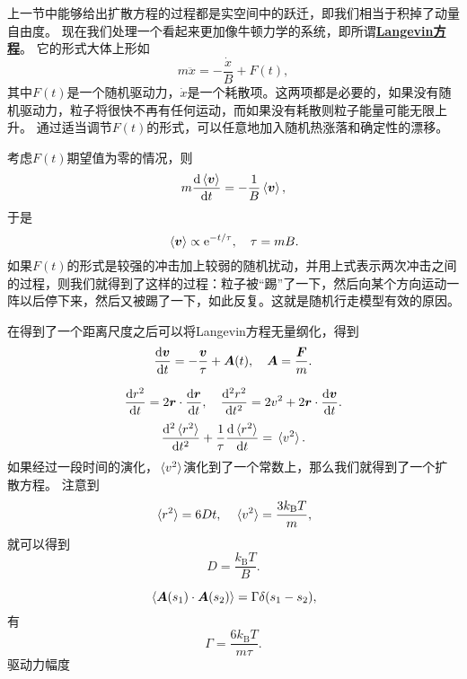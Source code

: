\documentclass[hyperref, UTF8, a4paper]{ctexart}
\newcommand*{\ee}{\mathrm{e}}
\newcommand{\concept}[1]{\underline{\textbf{#1}}}
\begin{document}
上一节中能够给出扩散方程的过程都是实空间中的跃迁，即我们相当于积掉了动量自由度。
现在我们处理一个看起来更加像牛顿力学的系统，即所谓\concept{Langevin方程}。
它的形式大体上形如
\begin{equation}
    m \ddot{x} = - \frac{\dot{x}}{B} + F(t),
\end{equation}
其中$F(t)$是一个随机驱动力，$\dot{x}$是一个耗散项。这两项都是必要的，如果没有随机驱动力，粒子将很快不再有任何运动，而如果没有耗散则粒子能量可能无限上升。
通过适当调节$F(t)$的形式，可以任意地加入随机热涨落和确定性的漂移。

考虑$F(t)$期望值为零的情况，则
\[
    m \dv{\expval*{\vb*{v}}}{t} = - \frac{1}{B} \expval*{\vb*{v}},
\]
于是
\begin{equation}
    \expval*{\vb*{v}} \propto \ee^{-t / \tau}, \quad \tau = mB.
\end{equation}
如果$F(t)$的形式是较强的冲击加上较弱的随机扰动，并用上式表示两次冲击之间的过程，则我们就得到了这样的过程：粒子被“踢”了一下，然后向某个方向运动一阵以后停下来，然后又被踢了一下，如此反复。这就是随机行走模型有效的原因。

在得到了一个距离尺度之后可以将Langevin方程无量纲化，得到
\begin{equation}
    \dv{\vb*{v}}{t} = - \frac{\vb*{v}}{\tau} + \vb*{A}(t), \quad \vb*{A} = \frac{\vb*{F}}{m}.
\end{equation}

\[
    \dv{r^2}{t} = 2 \vb*{r} \cdot \dv{\vb*{r}}{t}, \quad \dv[2]{r^2}{t} = 2 v^2 + 2 \vb*{r} \cdot \dv{\vb*{v}}{t}.
\]
\begin{equation}
    \dv[2]{\expval*{r^2}}{t} + \frac{1}{\tau} \dv{\expval*{r^2}}{t} = \expval*{v^2}.
\end{equation}
如果经过一段时间的演化，$\expval*{v^2}$演化到了一个常数上，那么我们就得到了一个扩散方程。
注意到
\[
    \expval*{r^2} = 6 D t, \quad \expval*{v^2} = \frac{3 k_\text{B} T}{m},
\]
就可以得到
\begin{equation}
    D = \frac{k_\text{B} T}{B}.
\end{equation}

\begin{equation}
    \expval*{\vb*{A}(s_1) \cdot \vb*{A}(s_2)} = \Gamma \delta(s_1 - s_2),
\end{equation}
有
\begin{equation}
    \Gamma = \frac{6 k_\text{B} T}{m \tau}.
\end{equation}
驱动力幅度
\end{document}
